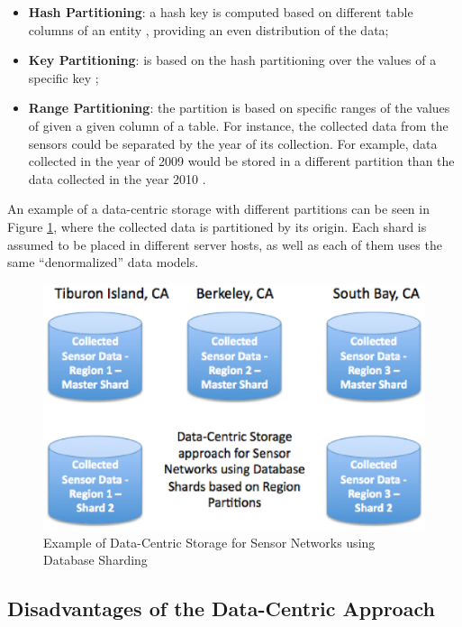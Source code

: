 \begin{itemize}
  \item \textbf{Hash Partitioning}: a hash key is computed based on
  different table columns of an entity \cite{db-shard-schemas,
  db-partitioning-relational}, providing an even distribution of the data;
  \item \textbf{Key Partitioning}: is based on the hash partitioning over the
  values of a specific key \cite{db-mongo-partition};
  \item \textbf{Range Partitioning}: the partition is based on specific ranges
  of the values of given a given column of a table. For instance, the collected
  data from the sensors could be separated by the year of its collection. For
  example, data collected in the year of 2009 would be stored in a different
  partition than the data collected in the year 2010
  \cite{db-partitioning-relational}.
\end{itemize}

An example of a data-centric storage with different partitions can be seen in
Figure \ref{fig:database-sharding-by-region}, where the collected data is
partitioned by its origin. Each shard is assumed to be placed in different
server hosts, as well as each of them uses the same ``denormalized'' data
models.

\begin{figure}[!h]
  \centering
  \includegraphics[scale=0.5]{../diagrams/database-sharding-by-region}
  \caption{Example of Data-Centric Storage for Sensor Networks using Database
  Sharding}
  \label{fig:database-sharding-by-region}
\end{figure}

\subsection{Disadvantages of the Data-Centric Approach}

